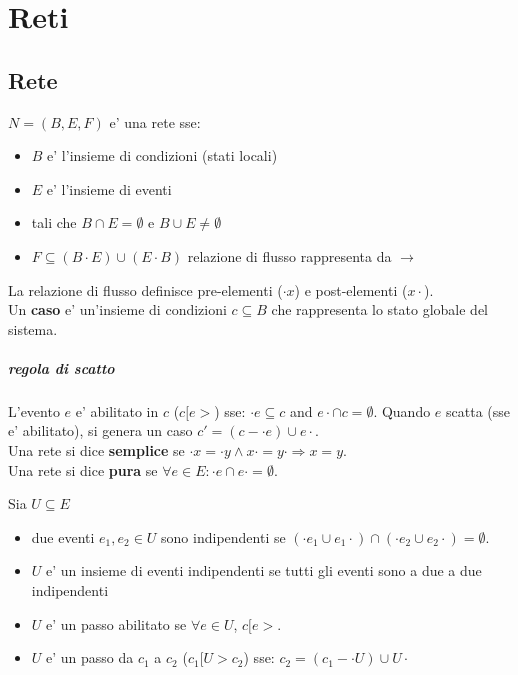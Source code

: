 \chapter{Reti}

\section{Rete}

$N = (B, E, F)$ e' una rete sse:
\begin{itemize}
  \item $B$ e' l'insieme di condizioni (stati locali)
  \item $E$ e' l'insieme di eventi
  \item tali che $B \cap E = \emptyset$ e $B \cup E \neq \emptyset$
  \item $F \subseteq (B \cdot E) \cup (E \cdot B)$ relazione di flusso rappresenta da $\rightarrow$
\end{itemize}

La relazione di flusso definisce pre-elementi ($\cdot x$) e post-elementi ($x \cdot$). \\

Un \textbf{caso} e' un'insieme di condizioni $c \subseteq B$ che rappresenta lo stato globale del sistema.

\paragraph{regola di scatto}

L'evento $e$ e' abilitato in $c$ ($c[e>$) sse: $\cdot e \subseteq c$ and $e \cdot \cap c = \emptyset$.
Quando $e$ scatta (sse e' abilitato), si genera un caso $c' = (c - \cdot e) \cup e \cdot$. \\

Una rete si dice \textbf{semplice} se $\cdot x = \cdot y \land x \cdot = y \cdot \Rightarrow x = y$.\\

Una rete si dice \textbf{pura} se $\forall e \in E : \cdot e \cap e \cdot = \emptyset$.

Sia $U \subseteq E$
\begin{itemize}
  \item due eventi $e_1,e_2 \in U$ sono indipendenti se $(\cdot e_1 \cup e_1 \cdot) \cap (\cdot e_2 \cup e_2 \cdot) = \emptyset$.
  \item $U$ e' un insieme di eventi indipendenti se tutti gli eventi sono a due a due indipendenti
  \item $U$ e' un passo abilitato se $\forall e \in U$, $c[e>$.
  \item $U$ e' un passo da $c_1$ a $c_2$ ($c_1[U>c_2$) sse: $c_2 = (c_1 - \cdot U) \cup U \cdot$
\end{itemize}

